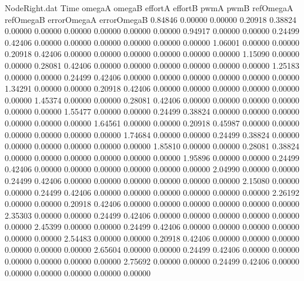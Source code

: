 \begin{filecontents}{NodeRight.dat}
Time omegaA omegaB effortA effortB pwmA pwmB refOmegaA refOmegaB errorOmegaA errorOmegaB
   0.84846    0.00000    0.00000     0.20918    0.38824    0.00000    0.00000    0.00000    0.00000    0.00000    0.00000
   0.94917    0.00000    0.00000     0.24499    0.42406    0.00000    0.00000    0.00000    0.00000    0.00000    0.00000
   1.06001    0.00000    0.00000     0.20918    0.42406    0.00000    0.00000    0.00000    0.00000    0.00000    0.00000
   1.15090    0.00000    0.00000     0.28081    0.42406    0.00000    0.00000    0.00000    0.00000    0.00000    0.00000
   1.25183    0.00000    0.00000     0.24499    0.42406    0.00000    0.00000    0.00000    0.00000    0.00000    0.00000
   1.34291    0.00000    0.00000     0.20918    0.42406    0.00000    0.00000    0.00000    0.00000    0.00000    0.00000
   1.45374    0.00000    0.00000     0.28081    0.42406    0.00000    0.00000    0.00000    0.00000    0.00000    0.00000
   1.55477    0.00000    0.00000     0.24499    0.38824    0.00000    0.00000    0.00000    0.00000    0.00000    0.00000
   1.64561    0.00000    0.00000     0.20918    0.45987    0.00000    0.00000    0.00000    0.00000    0.00000    0.00000
   1.74684    0.00000    0.00000     0.24499    0.38824    0.00000    0.00000    0.00000    0.00000    0.00000    0.00000
   1.85810    0.00000    0.00000     0.28081    0.38824    0.00000    0.00000    0.00000    0.00000    0.00000    0.00000
   1.95896    0.00000    0.00000     0.24499    0.42406    0.00000    0.00000    0.00000    0.00000    0.00000    0.00000
   2.04990    0.00000    0.00000     0.24499    0.42406    0.00000    0.00000    0.00000    0.00000    0.00000    0.00000
   2.15080    0.00000    0.00000     0.24499    0.42406    0.00000    0.00000    0.00000    0.00000    0.00000    0.00000
   2.26192    0.00000    0.00000     0.20918    0.42406    0.00000    0.00000    0.00000    0.00000    0.00000    0.00000
   2.35303    0.00000    0.00000     0.24499    0.42406    0.00000    0.00000    0.00000    0.00000    0.00000    0.00000
   2.45399    0.00000    0.00000     0.24499    0.42406    0.00000    0.00000    0.00000    0.00000    0.00000    0.00000
   2.54483    0.00000    0.00000     0.20918    0.42406    0.00000    0.00000    0.00000    0.00000    0.00000    0.00000
   2.65604    0.00000    0.00000     0.24499    0.42406    0.00000    0.00000    0.00000    0.00000    0.00000    0.00000
   2.75692    0.00000    0.00000     0.24499    0.42406    0.00000    0.00000    0.00000    0.00000    0.00000    0.00000

\end{filecontents}

